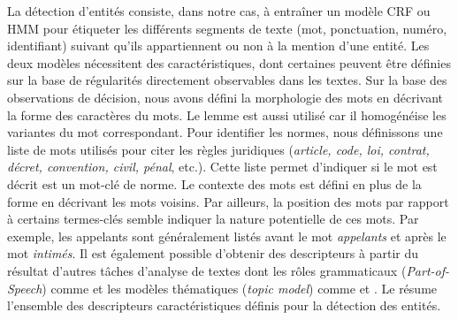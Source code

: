 La détection d'entités consiste, dans notre cas, à entraîner un modèle CRF ou HMM pour étiqueter les différents segments de texte (mot, ponctuation, numéro, identifiant) suivant qu'ils appartiennent ou non à la mention d'une entité. Les deux modèles nécessitent des caractéristiques, dont certaines peuvent être définies sur la base de régularités directement observables dans les textes. Sur la base des observations de décision, nous avons défini la morphologie des mots en décrivant la forme des caractères du mots. Le lemme est aussi utilisé car il homogénéise les variantes du mot correspondant. Pour identifier les normes,  nous définissons une liste de mots utilisés pour citer les règles juridiques (\textit{article, code, loi, contrat, décret, convention, civil, pénal}, etc.). Cette liste permet d'indiquer si le mot est décrit est un mot-clé de norme. Le contexte des mots est défini en plus de la forme en décrivant les mots voisins. Par ailleurs, la position des mots par rapport à certains termes-clés semble indiquer la nature potentielle de ces mots. Par exemple, les appelants sont généralement listés avant le mot \textit{appelants} et après le mot \textit{intimés}.
Il est également possible d'obtenir des descripteurs à partir du résultat d'autres tâches d'analyse de textes dont les rôles grammaticaux (\textit{Part-of-Speech}) comme \citet{chang2005applyingNER} et les modèles thématiques (\textit{topic model}) comme \citet{polifroni2011usingLDA} et \citet{nallapati2010blinddomaintransferner}. Le  résume l'ensemble des descripteurs caractéristiques définis pour la détection des entités.

%

